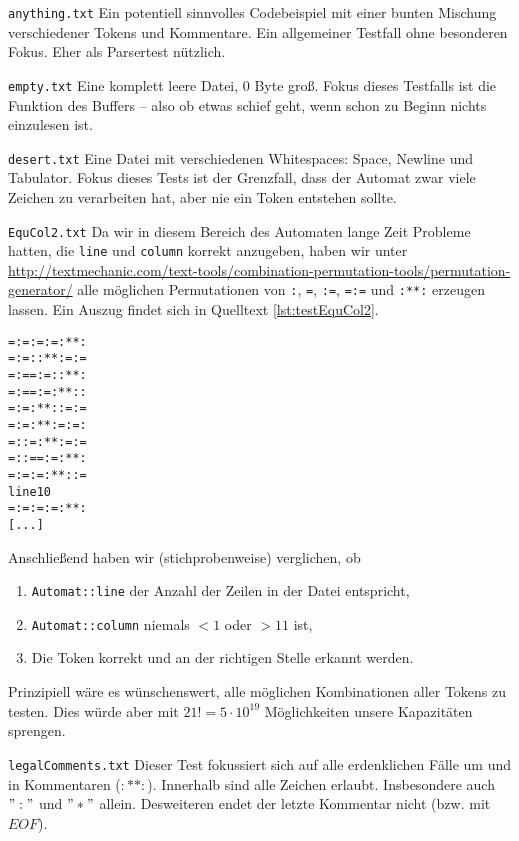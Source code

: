 \documentclass[
a4paper,   %
11pt,      %
oneside,   %
onecolumn, %
final      %
]{article}
\newcommand{\code}[1]{\lstinline$#1$}
\begin{document}
\begin{description}
\item{\texttt{anything.txt}} Ein potentiell sinnvolles Codebeispiel mit einer bunten Mischung verschiedener Tokens und Kommentare. Ein allgemeiner Testfall ohne besonderen Fokus. Eher als Parsertest nützlich.

\item{\texttt{empty.txt}} Eine komplett leere Datei, 0 Byte groß. Fokus dieses Testfalls ist die Funktion des Buffers -- also ob etwas schief geht, wenn schon zu Beginn nichts einzulesen ist.

\item{\texttt{desert.txt}} Eine Datei mit verschiedenen Whitespaces: Space, Newline und Tabulator. Fokus dieses Tests ist der Grenzfall, dass der Automat zwar viele Zeichen zu verarbeiten hat, aber nie ein Token entstehen sollte.

\item{\texttt{EquCol2.txt}} Da wir in diesem Bereich des Automaten lange Zeit Probleme hatten, die \code{line} und \code{column} korrekt anzugeben, haben wir unter \url{http://textmechanic.com/text-tools/combination-permutation-tools/permutation-generator/} alle möglichen Permutationen von \texttt{:}, \texttt{=}, \texttt{:=}, \texttt{=:=} und \texttt{:**:} erzeugen lassen.
Ein Auszug findet sich in Quelltext \ref{lst:testEquCol2}.

\begin{lstlisting}[language=SysProgLang, caption={EquCol2.txt}, label=lst:testEquCol2]
=:=:=:=:**:
=:=::**:=:=
=:==:=::**:
=:==:=:**::
=:=:**::=:=
=:=:**:=:=:
=::=:**:=:=
=::==:=:**:
=:=:=:**::=
line10
=:=:=:=:**:
[...]
\end{lstlisting}
Anschließend haben wir (stichprobenweise) verglichen, ob
\begin{enumerate}
\item \code{Automat::line} der Anzahl der Zeilen in der Datei entspricht,
\item \code{Automat::column} niemals $< 1$ oder $> 11$ ist,
\item Die Token korrekt und an der richtigen Stelle erkannt werden.
\end{enumerate}
Prinzipiell wäre es wünschenswert, alle möglichen Kombinationen aller Tokens zu testen. Dies würde aber mit $21! = 5 \cdot 10^{19}$ Möglichkeiten unsere Kapazitäten sprengen.

\item{\texttt{legalComments.txt}} Dieser Test fokussiert sich auf alle erdenklichen Fälle um und in Kommentaren ($:* *:$). Innerhalb sind alle Zeichen erlaubt. Insbesondere auch $":"$ und $"*"$ allein. Desweiteren endet der letzte Kommentar nicht (bzw. mit $EOF$).


\end{description}
\end{document}
